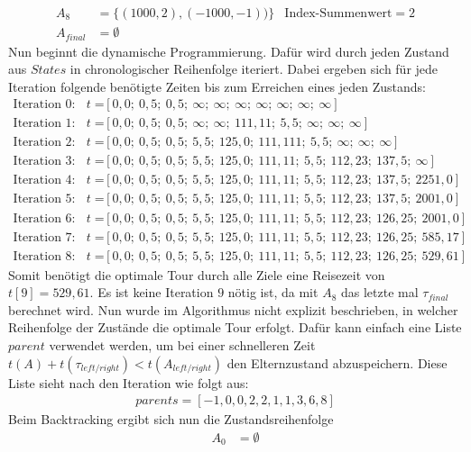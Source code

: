 \documentclass[german,version-2019-11]{uzl-thesis}
\begin{document}
\begin{example}
\begin{align*}
A_8&=\{(1000, 2), (-1000, -1))\} &\text{Index-Summenwert}=2\\
A_{final}&=\emptyset
\end{align*}
Nun beginnt die dynamische Programmierung. Dafür wird durch jeden Zustand aus $States$ in chronologischer Reihenfolge iteriert. Dabei ergeben sich für jede Iteration folgende benötigte Zeiten bis zum Erreichen eines jeden Zustands:
\begin{align*}
\text{Iteration 0:}~~~~t=&[0,0;~ 0,5;~ 0,5;~ \infty;~ \infty;~ \infty;~ \infty;~ \infty;~ \infty;~ \infty] \\
\text{Iteration 1:}~~~~t=&[0,0;~ 0,5;~ 0,5;~ \infty;~ \infty;~ 111,11;~ 5,5;~ \infty;~ \infty;~ \infty] \\
\text{Iteration 2:}~~~~t=&[0,0;~ 0,5;~ 0,5;~ 5,5;~ 125,0;~ 111,111;~ 5,5;~ \infty;~ \infty;~ \infty] \\
\text{Iteration 3:}~~~~t=&[0,0;~ 0,5;~ 0,5;~ 5,5;~ 125,0;~ 111,11;~ 5,5;~ 112,23;~ 137,5;~ \infty] \\
\text{Iteration 4:}~~~~t=&[0,0;~ 0,5;~ 0,5;~ 5,5;~ 125,0;~ 111,11;~ 5,5;~ 112,23;~ 137,5;~ 2251,0] \\
\text{Iteration 5:}~~~~t=&[0,0;~ 0,5;~ 0,5;~ 5,5;~ 125,0;~ 111,11;~ 5,5;~ 112,23;~ 137,5;~ 2001,0] \\
\text{Iteration 6:}~~~~t=&[0,0;~ 0,5;~ 0,5;~ 5,5;~ 125,0;~ 111,11;~ 5,5;~ 112,23;~ 126,25;~ 2001,0] \\
\text{Iteration 7:}~~~~t=&[0,0;~ 0,5;~ 0,5;~ 5,5;~ 125,0;~ 111,11;~ 5,5;~ 112,23;~ 126,25;~ 585,17] \\
\text{Iteration 8:}~~~~t=&[0,0;~ 0,5;~ 0,5;~ 5,5;~ 125,0;~ 111,11;~ 5,5;~ 112,23;~ 126,25;~ 529,61]
\end{align*}
Somit benötigt die optimale Tour durch alle Ziele eine Reisezeit von $t[9]=529,61$. Es ist keine Iteration $9$ nötig ist, da mit $A_{8}$ das letzte mal $\tau_{final}$ berechnet wird. Nun wurde im Algorithmus nicht explizit beschrieben, in welcher Reihenfolge der Zustände die optimale Tour erfolgt. Dafür kann einfach eine Liste $parent$ verwendet werden, um bei einer schnelleren Zeit {$t(A) + t(\tau_{left/right}) < t(A_{left/right})$} den Elternzustand abzuspeichern. Diese Liste sieht nach den Iteration wie folgt aus:
\begin{align*}
parents = [-1, 0, 0, 2, 2, 1, 1, 3, 6, 8]
\end{align*}
Beim Backtracking ergibt sich nun die Zustandsreihenfolge
\begin{align*}
A_0&=\emptyset\\

\end{align*}
\end{example}
\end{document}
